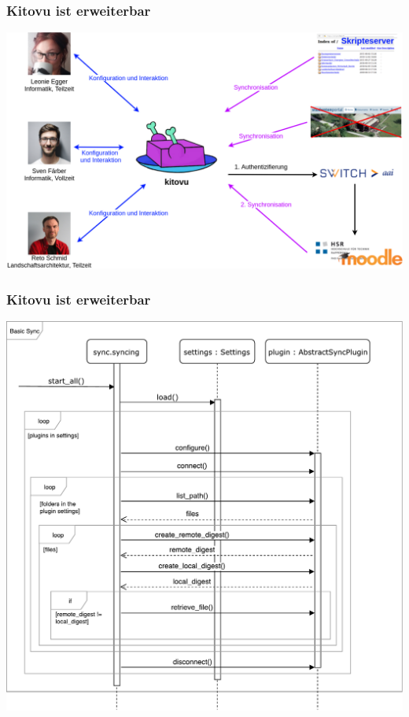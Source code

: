 \documentclass{beamer}
\begin{document}
  \begin{frame}
    \frametitle{Kitovu ist erweiterbar}
    \includegraphics[width=\linewidth]{../03_End_of_Elaboration/img/kontextdiagramm.png}
  \end{frame}

  \begin{frame}
    \frametitle{Kitovu ist erweiterbar}
    \includegraphics[height=0.9\textheight]{../03_End_of_Elaboration/img/GrobesSequenzDiagramm.pdf}
  \end{frame}
\end{document}
